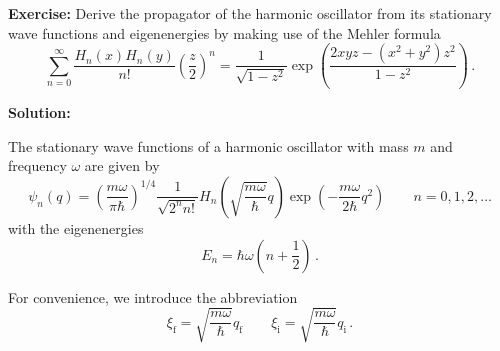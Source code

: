 \documentclass[11pt,DIV=19,parskip=half]{scrartcl}
\begin{document}
\pagestyle{empty}


\vspace{0.5truecm}
\textbf{Exercise:} Derive the propagator of the harmonic oscillator from its stationary
wave functions and eigenenergies by making use of the Mehler formula
\begin{equation}
 \sum_{n=0}^\infty\frac{H_n(x)H_n(y)}{n!}\left(\frac{z}{2}\right)^n
   = \frac{1}{\sqrt{1-z^2}}\exp\!\left(\frac{2xyz-(x^2+y^2)z^2}{1-z^2}\right)\,.
\end{equation}

\vspace{0.5truecm}
\textbf{Solution:}

The stationary wave functions of a harmonic oscillator with mass $m$ and frequency $\omega$
are given by
\begin{equation}
 \label{eq:eigenfunctions}
 \psi_n(q) = \left(\frac{m\omega}{\pi\hbar}\right)^{1/4}\frac{1}{\sqrt{2^nn!}}
	     H_n\left(\sqrt{\frac{m\omega}{\hbar}}q\right)\exp\!\left(-\frac{m\omega}{2\hbar}q^2\right)
 \qquad n=0, 1, 2,\ldots
\end{equation}
with the eigenenergies
\begin{equation}
 \label{eq:eigenenergies}
 E_n = \hbar\omega\left(n+\frac{1}{2}\right)\,.
\end{equation}

For convenience, we introduce the abbreviation
\begin{equation}
 \xi_\text{f} = \sqrt{\frac{m\omega}{\hbar}}q_\text{f}\qquad
 \xi_\text{i} = \sqrt{\frac{m\omega}{\hbar}}q_\text{i}\,.
\end{equation}
\end{document}
